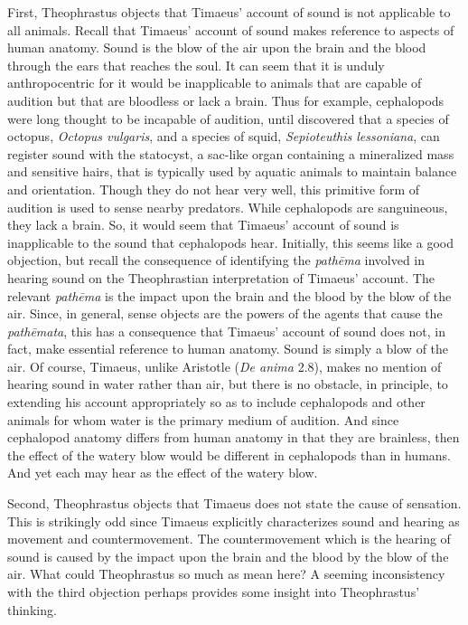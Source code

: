 First, Theophrastus objects that Timaeus' account of sound is not applicable to all animals. Recall that Timaeus' account of sound makes reference to aspects of human anatomy. Sound is the blow of the air upon the brain and the blood through the ears that reaches the soul. It can seem that it is unduly anthropocentric for it would be inapplicable to animals that are capable of audition but that are bloodless or lack a brain. Thus for example, cephalopods were long thought to be incapable of audition, until \citet{Hu:2009ov} discovered that a species of octopus, \emph{Octopus vulgaris}, and a species of squid, \emph{Sepioteuthis lessoniana}, can register sound with the statocyst, a sac-like organ containing a mineralized mass and sensitive hairs, that is typically used by aquatic animals to maintain balance and orientation. Though they do not hear very well, this primitive form of audition is used to sense nearby predators. While cephalopods are sanguineous, they lack a brain. So, it would seem that Timaeus' account of sound is inapplicable to the sound that cephalopods hear. Initially, this seems like a good objection, but recall the consequence of identifying the \emph{pathēma} involved in hearing sound on the Theophrastian interpretation of Timaeus' account. The relevant \emph{pathēma} is the impact upon the brain and the blood by the blow of the air. Since, in general, sense objects are the powers of the agents that cause the \emph{pathēmata}, this has a consequence that Timaeus' account of sound does not, in fact, make essential reference to human anatomy. Sound is simply a blow of the air. Of course, Timaeus, unlike Aristotle (\emph{De anima} 2.8), makes no mention of hearing sound in water rather than air, but there is no obstacle, in principle, to extending his account appropriately so as to include cephalopods and other animals for whom water is the primary medium of audition. And since cephalopod anatomy differs from human anatomy in that they are brainless, then the effect of the watery blow would be different in cephalopods than in humans. And yet each may hear as the effect of the watery blow.

Second, Theophrastus objects that Timaeus does not state the cause of sensation. This is strikingly odd since Timaeus explicitly characterizes sound and hearing as movement and countermovement. The countermovement which is the hearing of sound is caused by the impact upon the brain and the blood by the blow of the air. What could Theophrastus so much as mean here? A seeming inconsistency with the third objection perhaps provides some insight into Theophrastus' thinking.

